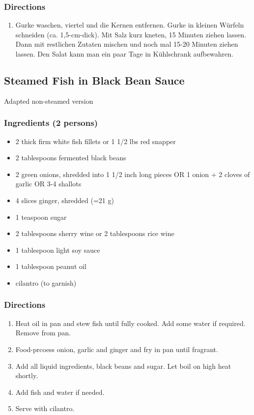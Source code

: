 \subsubsection*{Directions}
\begin{enumerate}
\item Gurke waschen, viertel und die Kernen entfernen. Gurke in kleinen Würfeln schneiden (ca. 1,5-cm-dick). Mit Salz kurz kneten, 15 Minuten ziehen lassen. Dann mit restlichen Zutaten mischen und noch mal 15-20 Minuten ziehen lassen.
Den Salat kann man ein paar Tage in Kühlschrank aufbewahren.
\end{enumerate}
\pagebreak


\subsection{Steamed Fish in Black Bean Sauce}
Adapted non-steamed version
\subsubsection*{Ingredients (2 persons)}
\begin{itemize}
\item[] 2 thick firm white fish fillets or 1 1/2 lbs red snapper 
\item[] 2 tablespoons fermented black beans
\item[] 2 green onions, shredded into 1 1/2 inch long pieces OR 1 onion + 2 cloves of garlic OR 3-4 shallots
\item[] 4 slices ginger, shredded (=21 g)
\item[] 1 teaspoon sugar
\item[] 2 tablespoons sherry wine or 2 tablespoons rice wine
\item[] 1 tablespoon light soy sauce
\item[] 1 tablespoon peanut oil
\item[] cilantro (to garnish)
\end{itemize}
\subsubsection*{Directions}
\begin{enumerate}
\item Heat oil in pan and stew fish until fully cooked. Add some water if required. Remove from pan.
\item Food-prcoess onion, garlic and ginger and fry in pan until fragrant.
\item Add all liquid ingredients, black beans and sugar. Let boil on high heat shortly.
\item Add fish and water if needed.
\item Serve with cilantro.
\end{enumerate}
\pagebreak


